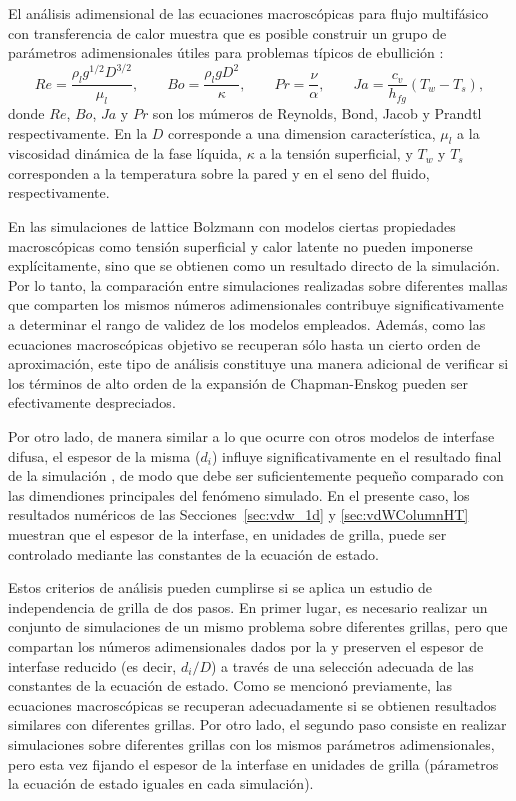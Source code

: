El an\'alisis adimensional de las ecuaciones macrosc\'opicas para flujo multif\'asico con transferencia de calor muestra que es posible construir un grupo de par\'ametros adimensionales \'utiles para problemas t\'ipicos de ebullici\'on \cite{ajaev_modeling_2006, hua_numerical_2007}:
\begin{equation}
	Re = \dfrac{\rho_l g^{1/2} D^{3/2}}{\mu_l}, \qquad
	Bo = \dfrac{\rho_l g D^2}{\kappa}, \qquad
	Pr = \dfrac{\nu}{\alpha}, \qquad
	Ja = \dfrac{c_v}{h_{fg}}(T_w-T_s),
	\label{eq:num_adim_hetb}
\end{equation}
donde $Re$, $Bo$, $Ja$ y $Pr$ son los m\'umeros de Reynolds, Bond, Jacob y Prandtl respectivamente. En la  $D$ corresponde a una dimension caracter\'istica, $\mu_l$ a la viscosidad din\'amica de la fase l\'iquida, $\kappa$ a la tensi\'on superficial, y $T_w$ y $T_s$ corresponden a la temperatura sobre la pared y en el seno del fluido, respectivamente. 

En las simulaciones de lattice Bolzmann con modelos \pp{} ciertas propiedades macrosc\'opicas como tensi\'on superficial y calor latente no pueden imponerse expl\'icitamente, sino que se obtienen como un resultado directo de la simulaci\'on. Por lo tanto, la comparaci\'on entre simulaciones realizadas sobre diferentes mallas que comparten los mismos n\'umeros adimensionales contribuye significativamente a determinar el rango de validez de los modelos empleados. Adem\'as, como las ecuaciones macrosc\'opicas objetivo se recuperan s\'olo hasta un cierto orden de aproximaci\'on, este tipo de an\'alisis constituye una manera adicional de verificar si los t\'erminos de alto orden de la expansi\'on de Chapman-Enskog pueden ser efectivamente despreciados.

Por otro lado, de manera similar a lo que ocurre con otros modelos de interfase difusa, el espesor de la misma ($d_i$) influye significativamente en el resultado final de la simulaci\'on \cite{ding_diffuse_2007}, de modo que debe ser suficientemente peque\~no comparado con las dimendiones principales del fen\'omeno simulado. En el presente caso, los resultados num\'ericos de las Secciones~\ref{sec:vdw_1d} y \ref{sec:vdWColumnHT} muestran que el espesor de la interfase, en unidades de grilla, puede ser controlado mediante las constantes de la ecuaci\'on de estado. 

Estos criterios de an\'alisis pueden cumplirse si se aplica un estudio de independencia de grilla de dos pasos. En primer lugar, es necesario realizar un conjunto de simulaciones de un mismo problema sobre diferentes grillas, pero que compartan los n\'umeros adimensionales dados por la  y preserven el espesor de interfase reducido (es decir, $d_i/D$) a trav\'es de una selecci\'on adecuada de las constantes de la ecuaci\'on de estado. Como se mencion\'o previamente, las ecuaciones macrosc\'opicas se recuperan adecuadamente si se obtienen resultados similares con diferentes grillas. Por otro lado, el segundo paso consiste en realizar simulaciones sobre diferentes grillas con los mismos par\'ametros adimensionales, pero esta vez fijando el espesor de la interfase en unidades de grilla (p\'arametros la ecuaci\'on de estado iguales en cada simulaci\'on). \newline

